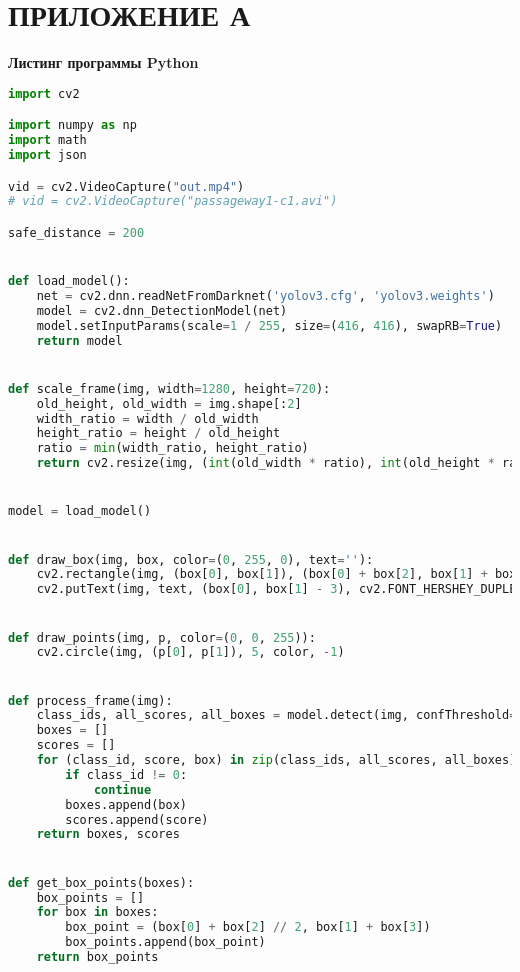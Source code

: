 \chapter*{\hfill ПРИЛОЖЕНИЕ А}

\begin{center}
	\textbf{Листинг программы Python}
\end{center}

\begin{lstlisting}[language=Python]
import cv2

import numpy as np
import math
import json

vid = cv2.VideoCapture("out.mp4")
# vid = cv2.VideoCapture("passageway1-c1.avi")

safe_distance = 200


def load_model():
    net = cv2.dnn.readNetFromDarknet('yolov3.cfg', 'yolov3.weights')
    model = cv2.dnn_DetectionModel(net)
    model.setInputParams(scale=1 / 255, size=(416, 416), swapRB=True)
    return model


def scale_frame(img, width=1280, height=720):
    old_height, old_width = img.shape[:2]
    width_ratio = width / old_width
    height_ratio = height / old_height
    ratio = min(width_ratio, height_ratio)
    return cv2.resize(img, (int(old_width * ratio), int(old_height * ratio)), fx=0, fy=0, interpolation=cv2.INTER_CUBIC)


model = load_model()


def draw_box(img, box, color=(0, 255, 0), text=''):
    cv2.rectangle(img, (box[0], box[1]), (box[0] + box[2], box[1] + box[3]), color=color, thickness=2)
    cv2.putText(img, text, (box[0], box[1] - 3), cv2.FONT_HERSHEY_DUPLEX, 1, color=color, thickness=2)


def draw_points(img, p, color=(0, 0, 255)):
    cv2.circle(img, (p[0], p[1]), 5, color, -1)


def process_frame(img):
    class_ids, all_scores, all_boxes = model.detect(img, confThreshold=0.6, nmsThreshold=0.4)
    boxes = []
    scores = []
    for (class_id, score, box) in zip(class_ids, all_scores, all_boxes):
        if class_id != 0:
            continue
        boxes.append(box)
        scores.append(score)
    return boxes, scores


def get_box_points(boxes):
    box_points = []
    for box in boxes:
        box_point = (box[0] + box[2] // 2, box[1] + box[3])
        box_points.append(box_point)
    return box_points



\end{lstlisting}
